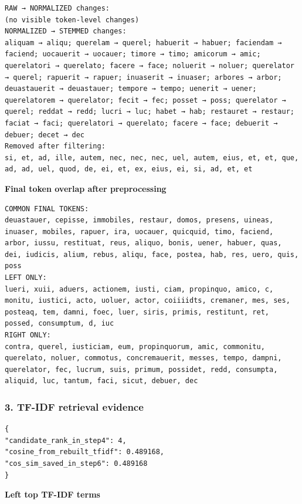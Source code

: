 \begin{lstlisting}[breaklines=true,basicstyle=\ttfamily\small]
RAW → NORMALIZED changes:
(no visible token-level changes)
NORMALIZED → STEMMED changes:
aliquam → aliqu; querelam → querel; habuerit → habuer; faciendam → faciend; uocauerit → uocauer; timore → timo; amicorum → amic; querelatori → querelato; facere → face; noluerit → noluer; querelator → querel; rapuerit → rapuer; inuaserit → inuaser; arbores → arbor; deuastauerit → deuastauer; tempore → tempo; uenerit → uener; querelatorem → querelator; fecit → fec; posset → poss; querelator → querel; reddat → redd; lucri → luc; habet → hab; restauret → restaur; faciat → faci; querelatori → querelato; facere → face; debuerit → debuer; decet → dec
Removed after filtering:
si, et, ad, ille, autem, nec, nec, nec, uel, autem, eius, et, et, que, ad, ad, uel, quod, de, ei, et, ex, eius, ei, si, ad, et, et
\end{lstlisting}

\textbf{Final token overlap after preprocessing} 

\begin{lstlisting}[breaklines=true,basicstyle=\ttfamily\small]
COMMON FINAL TOKENS:
deuastauer, cepisse, immobiles, restaur, domos, presens, uineas, inuaser, mobiles, rapuer, ira, uocauer, quicquid, timo, faciend, arbor, iussu, restituat, reus, aliquo, bonis, uener, habuer, quas, dei, iudicis, alium, rebus, aliqu, face, postea, hab, res, uero, quis, poss
LEFT ONLY:
lueri, xuii, aduers, actionem, iusti, ciam, propinquo, amico, c, monitu, iustici, acto, uoluer, actor, coiiiidts, cremaner, mes, ses, posteaq, tem, damni, foec, luer, siris, primis, restitunt, ret, possed, consumptum, d, iuc
RIGHT ONLY:
contra, querel, iusticiam, eum, propinquorum, amic, commonitu, querelato, noluer, commotus, concremauerit, messes, tempo, dampni, querelator, fec, lucrum, suis, primum, possidet, redd, consumpta, aliquid, luc, tantum, faci, sicut, debuer, dec
\end{lstlisting}

\subsubsection{3. TF-IDF retrieval evidence}

\begin{lstlisting}[breaklines=true,basicstyle=\ttfamily\small,language={}]
{
"candidate_rank_in_step4": 4,
"cosine_from_rebuilt_tfidf": 0.489168,
"cos_sim_saved_in_step6": 0.489168
}
\end{lstlisting}

\textbf{Left top TF-IDF terms} 

